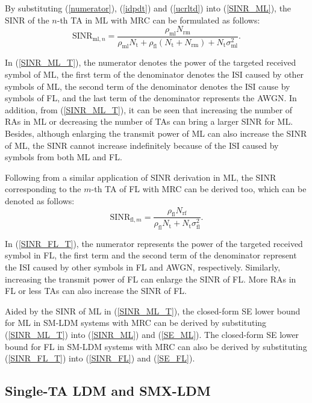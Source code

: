\documentclass[journal]{IEEEtran}
\begin{document}
By substituting (\ref{numerator}), (\ref{idpdt}) and (\ref{ucrltd}) into (\ref{SINR_ML}), the SINR of the $n$-th TA in ML with MRC can be formulated as follows:
\begin{equation}
\text{SINR}_{\text{ml},n} = \frac{\rho_\text{ml}N_\text{rm}} {\rho_\text{ml}N_\text{t} + \rho_\text{fl}(N_\text{t}+N_\text{rm}) + N_\text{t}\sigma_\text{ml}^2}.
\label{SINR_ML_T}
\end{equation}

In (\ref{SINR_ML_T}), the numerator denotes the power of the targeted received symbol of ML, the first term of the denominator denotes the ISI caused by other symbols of ML, the second term of the denominator denotes the ISI cause by symbols of FL, and the last term of the denominator represents the AWGN. In addition, from (\ref{SINR_ML_T}), it can be seen that increasing the number of RAs in ML or decreasing the number of TAs can bring a larger SINR for ML. Besides, although enlarging the transmit power of ML can also increase the SINR of ML, the SINR cannot increase indefinitely because of the ISI caused by symbols from both ML and FL.

Following from a similar application of SINR derivation in ML, the SINR corresponding to the $m$-th TA of FL with MRC can be derived too, which can be denoted as follows:
\begin{equation}
\text{SINR}_{\text{fl},m} = \frac{\rho_\text{fl}N_\text{rf}} {\rho_\text{fl}N_\text{t} + N_\text{t}\sigma_\text{fl}^2}.
\label{SINR_FL_T}
\end{equation}

In (\ref{SINR_FL_T}), the numerator represents the power of the targeted received symbol in FL, the first term and the second term of the denominator represent the ISI caused by other symbols in FL and AWGN, respectively. Similarly, increasing the transmit power of FL can enlarge the SINR of FL. More RAs in FL or less TAs can also increase the SINR of FL.

Aided by the SINR of ML in (\ref{SINR_ML_T}), the closed-form SE lower bound for ML in SM-LDM systems with MRC can be derived by substituting (\ref{SINR_ML_T}) into (\ref{SINR_ML}) and (\ref{SE_ML}). The closed-form SE lower bound for FL in SM-LDM systems with MRC can also be derived by substituting (\ref{SINR_FL_T}) into (\ref{SINR_FL}) and (\ref{SE_FL}).

\subsection{Single-TA LDM and SMX-LDM}
\end{document}
